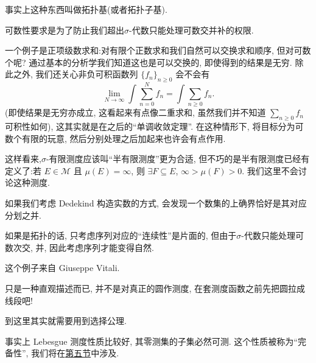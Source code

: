 \begin{alterendnote}
    事实上这种东西叫做拓扑基(或者拓扑子基).
\end{alterendnote}
\begin{alterendnote}
    可数性要求是为了防止我们超出\;$\sigma $-代数只能处理可数交并补的权限.
\end{alterendnote}
\begin{alterendnote}
    一个例子是正项级数求和:对有限个正数求和我们自然可以交换求和顺序, 但对可数个呢? 通过基本的分析学我们知道这也是可以交换的, 即使得到的结果是无穷. 除此之外, 我们还关心非负可积函数列 $\{f_n\}_{n\geqslant 0}$ 会不会有\[\lim_{N \to \infty} \int \sum_{n=0}^N f_n = \int\sum_{n\geqslant 0}f_n.\](即使结果是无穷亦成立, 这看起来有点像二重求和, 虽然我们并不知道 $\sum_{n\geqslant 0} f_n$ 可积性如何), 这其实就是在之后的``单调收敛定理''. 在这种情形下, 将目标分为可数个有限的玩意, 然后分别处理之后加起来也许会有点作用.
\end{alterendnote}
\begin{alterendnote}
    这样看来,\;$\sigma $-有限测度应该叫``半有限测度''更为合适, 但不巧的是半有限测度已经有定义了:若 $E\in\mathcal M$ 且 $\mu (E)=\infty$, 则 $\exists F\subseteq E$, $\infty>\mu (F)>0$. 我们这里不会讨论这种测度.
\end{alterendnote}
\begin{alterendnote}
    如果我们考虑 Dedekind 构造实数的方式, 会发现一个数集的上确界恰好是其对应分划之并.
\end{alterendnote}
\begin{alterendnote}
    如果是拓扑的话, 只考虑序列对应的``连续性''是片面的, 但由于\;$\sigma $-代数只能处理可数次交, 并, 因此考虑序列才能变得自然.
\end{alterendnote}
\begin{alterendnote}
    这个例子来自 Giuseppe Vitali.
\end{alterendnote}
\begin{alterendnote}
    只是一种直观描述而已, 并不是对真正的圆作测度, 在套测度函数之前先把圆拉成线段吧!
\end{alterendnote}
\begin{alterendnote}
    到这里其实就需要用到选择公理.
\end{alterendnote}
\begin{alterendnote}
    事实上 Lebesgue 测度性质比较好, 其零测集的子集必然可测. 这个性质被称为``完备性'', 我们将在\hyperref[外测度与测度的完备化]{第五节}中涉及.
\end{alterendnote}
